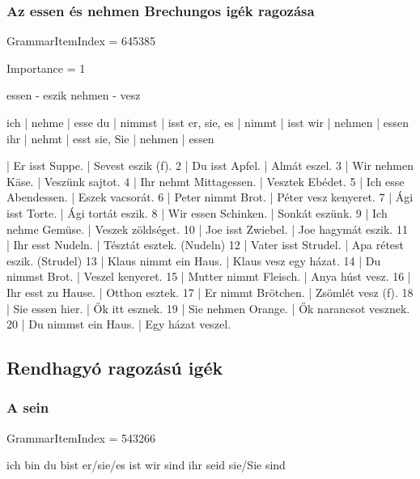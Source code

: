 \documentclass{article}
\newenvironment{desc}{\verbatim}{\endverbatim}
\newenvironment{exmp}{\verbatim}{\endverbatim}
\begin{document}
\begin{exmp}
\end{exmp}

\subsubsection{Az essen és nehmen Brechungos igék ragozása}

GrammarItemIndex = 645385

Importance = 1

\begin{desc}
essen - eszik
nehmen - vesz

ich         | nehme  | esse 
du          | nimmst | isst 
er, sie, es | nimmt  | isst 
wir         | nehmen | essen 
ihr         | nehmt  | esst 
sie, Sie    | nehmen | essen 
\end{desc}

\begin{exmp}
1 | Er isst Suppe. | Sevest eszik (f).
2 | Du isst Apfel. | Almát eszel.
3 | Wir nehmen Käse. | Veszünk sajtot.
4 | Ihr nehmt Mittagessen. | Vesztek Ebédet.
5 | Ich esse Abendessen. | Eszek vacsorát.
6 | Peter nimmt Brot. | Péter vesz kenyeret.
7 | Ági isst Torte. | Ági tortát eszik.
8 | Wir essen Schinken. | Sonkát eszünk.
9 | Ich nehme Gemüse. | Veszek zöldséget.
10 | Joe isst Zwiebel. | Joe hagymát eszik.
11 | Ihr esst Nudeln. | Tésztát esztek. (Nudeln)
12 | Vater isst Strudel. | Apa rétest eszik. (Strudel)
13 | Klaus nimmt ein Haus. | Klaus vesz egy házat.
14 | Du nimmst Brot. | Veszel kenyeret.
15 | Mutter nimmt Fleisch. | Anya húst vesz.
16 | Ihr esst zu Hause. | Otthon esztek.
17 | Er nimmt Brötchen. | Zsömlét vesz (f).
18 | Sie essen hier. | Ők itt esznek.
19 | Sie nehmen Orange. | Ők narancsot vesznek.
20 | Du nimmst ein Haus. | Egy házat veszel.
\end{exmp}

\subsection{Rendhagyó ragozású igék}

\subsubsection{A sein}

GrammarItemIndex = 543266

\begin{desc}
ich bin 
du bist 
er/sie/es ist 
wir sind 
ihr seid 
sie/Sie sind 
\end{desc}
\end{document}
